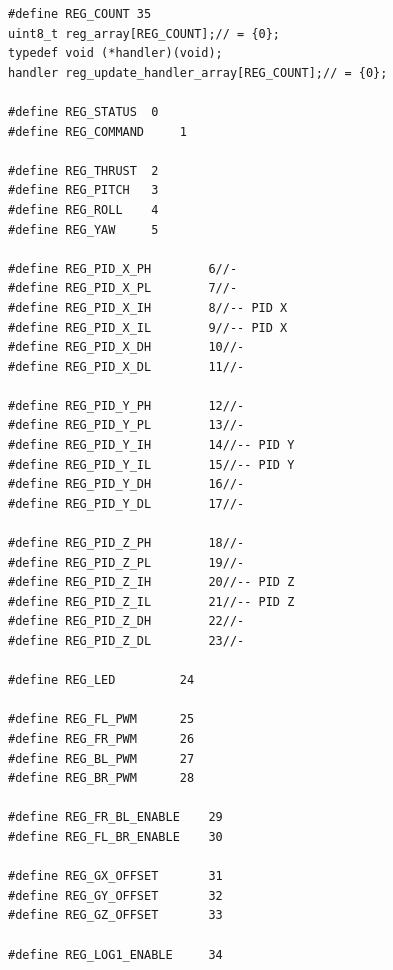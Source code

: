 \documentclass[11pt, twoside]{Thesis} %
\begin{document}
\begin{lstlisting}
#define REG_COUNT 35
uint8_t reg_array[REG_COUNT];// = {0};
typedef void (*handler)(void);
handler reg_update_handler_array[REG_COUNT];// = {0};

#define REG_STATUS 	0
#define REG_COMMAND 	1

#define REG_THRUST	2
#define REG_PITCH	3
#define REG_ROLL	4
#define REG_YAW		5

#define REG_PID_X_PH		6//-
#define REG_PID_X_PL		7//-
#define REG_PID_X_IH		8//-- PID X
#define REG_PID_X_IL		9//-- PID X
#define REG_PID_X_DH		10//-
#define REG_PID_X_DL		11//-

#define REG_PID_Y_PH		12//-
#define REG_PID_Y_PL		13//-
#define REG_PID_Y_IH		14//-- PID Y
#define REG_PID_Y_IL		15//-- PID Y
#define REG_PID_Y_DH		16//-
#define REG_PID_Y_DL		17//-

#define REG_PID_Z_PH		18//-
#define REG_PID_Z_PL		19//-
#define REG_PID_Z_IH		20//-- PID Z
#define REG_PID_Z_IL		21//-- PID Z
#define REG_PID_Z_DH		22//-
#define REG_PID_Z_DL		23//-

#define REG_LED			24

#define REG_FL_PWM		25
#define REG_FR_PWM		26
#define REG_BL_PWM		27
#define REG_BR_PWM		28

#define REG_FR_BL_ENABLE	29
#define REG_FL_BR_ENABLE	30

#define REG_GX_OFFSET		31
#define REG_GY_OFFSET		32
#define REG_GZ_OFFSET		33

#define REG_LOG1_ENABLE		34
\end{lstlisting}
\end{document}
